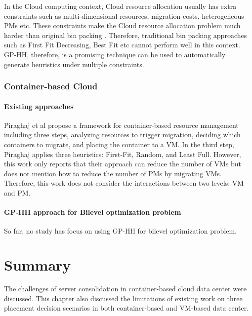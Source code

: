 In the Cloud computing context,  Cloud resource allocation usually has extra constraints such as multi-dimensional resources, migration costs, heterogeneous PMs etc. These constraints make the Cloud resource allocation problem much harder than original bin packing \cite{Mann:2015ua}. Therefore, traditional bin packing approaches such as First Fit Decreasing, Best Fit etc cannot perform well in this context.  GP-HH, therefore, is a promising technique can be used to automatically generate heuristics under multiple constraints.

\subsubsection{Container-based Cloud}
\paragraph{Existing approaches}
Piraghaj et al \cite{Piraghaj:2015dv} propose a framework for container-based resource management including three steps, analyzing resources to trigger migration, deciding which containers to migrate, and placing the container to a VM. In the third step, Piraghaj applies three heuristics: First-Fit, Random, and Least Full. However, this work only reports that their approach can reduce the number of VMs but does not mention how to reduce the number of PMs by migrating VMs. Therefore, this work does not consider the interactions between two levels: VM and PM. 

\paragraph{GP-HH approach for Bilevel optimization problem}
So far, no study has focus on using GP-HH for bilevel optimization problem. 
\section{Summary}

 The challenges of server consolidation in container-based cloud data center were discussed. This chapter also discussed the limitations of existing work on three placement decision scenarios in both container-based and VM-based data center. 

